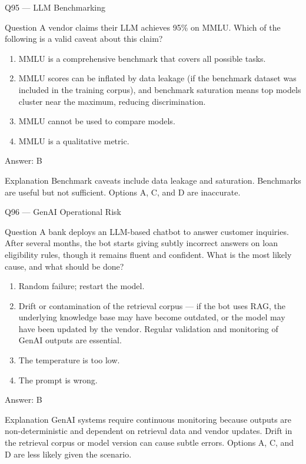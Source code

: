 \documentclass[aspectratio=169,8pt]{beamer}
\begin{document}
\begin{frame}{Q95 --- LLM Benchmarking}
\begin{block}{Question}
A vendor claims their LLM achieves 95\% on MMLU. Which of the following is a valid caveat about this claim?
\end{block}
\begin{enumerate}
\item MMLU is a comprehensive benchmark that covers all possible tasks.
\item MMLU scores can be inflated by data leakage (if the benchmark dataset was included in the training corpus), and benchmark saturation means top models cluster near the maximum, reducing discrimination.
\item MMLU cannot be used to compare models.
\item MMLU is a qualitative metric.
\end{enumerate}
\begin{exampleblock}{Answer: B}\end{exampleblock}
\begin{block}{Explanation}
Benchmark caveats include data leakage and saturation. Benchmarks are useful but not sufficient. Options A, C, and D are inaccurate.
\end{block}
\end{frame}

\begin{frame}{Q96 --- GenAI Operational Risk}
\begin{block}{Question}
A bank deploys an LLM-based chatbot to answer customer inquiries. After several months, the bot starts giving subtly incorrect answers on loan eligibility rules, though it remains fluent and confident. What is the most likely cause, and what should be done?
\end{block}
\begin{enumerate}
\item Random failure; restart the model.
\item Drift or contamination of the retrieval corpus --- if the bot uses RAG, the underlying knowledge base may have become outdated, or the model may have been updated by the vendor. Regular validation and monitoring of GenAI outputs are essential.
\item The temperature is too low.
\item The prompt is wrong.
\end{enumerate}
\begin{exampleblock}{Answer: B}\end{exampleblock}
\begin{block}{Explanation}
GenAI systems require continuous monitoring because outputs are non-deterministic and dependent on retrieval data and vendor updates. Drift in the retrieval corpus or model version can cause subtle errors. Options A, C, and D are less likely given the scenario.
\end{block}
\end{frame}
\end{document}
